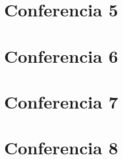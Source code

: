 \documentclass[]{article}
\begin{document}

\section*{Conferencia 5}


\section*{Conferencia 6}


\section*{Conferencia 7}


\section*{Conferencia 8}




 

\end{document}
